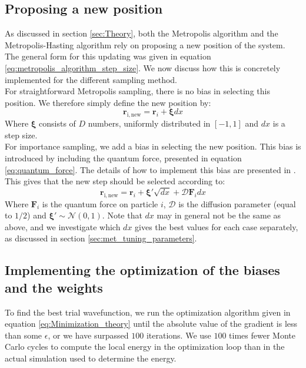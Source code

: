 \documentclass[a4paper, 10pt]{article}
\begin{document}
	\subsection{Proposing a new position}\label{sec:met_propose_new_position}
	As discussed in section \ref{sec:Theory}, both the Metropolis algorithm and the Metropolis-Hasting algorithm rely on proposing a new position of the system. The general form for this updating was given in equation \ref{eq:metropolis_algorithm_step_size}. We now discuss how this is concretely implemented for the different sampling method.\\
	\linebreak
	For straightforward Metropolis sampling, there is no bias in selecting this position. We therefore simply define the new position by:
	\begin{equation}
	\boldsymbol{r}_{\mathrm{i,new}}=\boldsymbol{r}_i+\boldsymbol{\xi}dx
	\end{equation}
	Where $\boldsymbol{\xi}$ consists of $D$ numbers, uniformly distributed in $[-1,1]$ and $dx$ is a step size.\\
	\linebreak
	For importance sampling, we add a bias in selecting the new position. This bias is introduced by including the quantum force, presented in equation \ref{eq:quantum_force}. The details of how to implement this bias are presented in \cite{Hjorth-Jensen2015}. This gives that the new step should be selected according to:
	\begin{equation}
	\boldsymbol{r}_{\mathrm{i,new}}=\boldsymbol{r}_i+\boldsymbol{\xi'}\sqrt{dx}+\mathcal{D}\boldsymbol{F}_i dx
	\end{equation}
	Where $\boldsymbol{F}_i$ is the quantum force on particle $i$, $\mathcal{D}$ is the diffusion parameter (equal to $1/2$) and $\boldsymbol{\xi'}\sim \mathcal{N}(0,1)$. Note that $dx$ may in general not be the same as above, and we investigate which $dx$ gives the best values for each case separately, as discussed in section \ref{sec:met_tuning_parameters}.
	\subsection{Implementing the optimization of the biases and the weights}
	To find the best trial wavefunction, we run the optimization algorithm given in equation \ref{eq:Minimization_theory} until the absolute value of the gradient is less than some $\epsilon$, or we have surpassed $100$ iterations. We use $100$ times fewer Monte Carlo cycles to compute the local energy in the optimization loop than in the actual simulation used to determine the energy.
\end{document}
